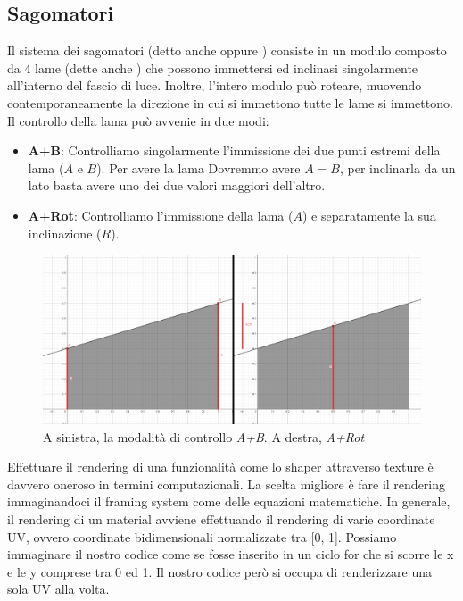 \documentclass[main.tex]{subfiles}
\begin{document}
\subsection{Sagomatori}\label{subsec:5_shaper}
Il sistema dei sagomatori (detto anche  oppure ) consiste in un modulo composto da 4 lame (dette anche ) che possono immettersi ed inclinasi singolarmente all'interno del fascio di luce. Inoltre, l'intero modulo può roteare, muovendo contemporaneamente la direzione in cui si immettono tutte le lame si immettono.
Il controllo della lama può avvenie in due modi:
\begin{itemize}
	\item \textbf{A+B}: Controlliamo singolarmente l'immissione dei due punti estremi della lama ($A$ e $B$). Per avere la lama  Dovremmo avere $A = B$, per inclinarla da un lato basta avere uno dei due valori maggiori dell'altro.
	\item \textbf{A+Rot}: Controlliamo l'immissione della lama ($A$) e separatamente la sua inclinazione ($R$).
\end{itemize}
\begin{figure}[H]
    \centering
    \includegraphics[width=1\linewidth]{img/newFeatures/abVSarot.png}
    \caption{A sinistra, la modalità di controllo \textit{A+B}. A destra, \textit{A+Rot}}
    \label{fig:5_shaperFixes}
\end{figure}

Effettuare il rendering di una funzionalità come lo shaper attraverso texture è davvero oneroso in termini computazionali. La scelta migliore è fare il rendering immaginandoci il framing system come delle equazioni matematiche. In generale, il rendering di un material avviene effettuando il rendering di varie coordinate UV, ovvero coordinate bidimensionali normalizzate tra [0, 1]. Possiamo immaginare il nostro codice come se fosse inserito in un ciclo for che si scorre  le x e le y comprese tra 0 ed 1. Il nostro codice però si occupa di renderizzare una sola UV alla volta. 
\end{document}
